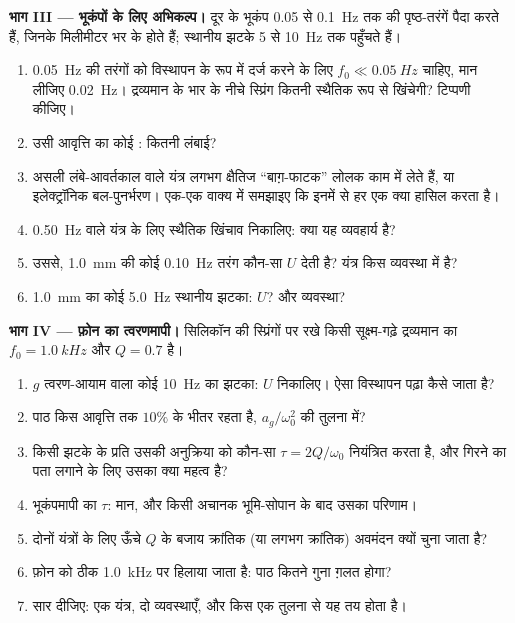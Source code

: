 \begin{problem}
\medskip
\noindent\textbf{भाग III --- भूकंपों के लिए अभिकल्प।}
दूर के भूकंप \qty{0.05}{} से \qty{0.1}{Hz} तक की पृष्ठ-तरंगें पैदा करते हैं,
जिनके  मिलीमीटर भर के होते हैं; स्थानीय झटके \qty{5}{} से \qty{10}{Hz}
तक पहुँचते हैं।
\begin{enumerate}[resume]
  \item \qty{0.05}{Hz} की तरंगों को विस्थापन के रूप में दर्ज करने के लिए
        $f_0 \ll \qty{0.05}{Hz}$ चाहिए, मान लीजिए \qty{0.02}{Hz}।
        द्रव्यमान के भार के नीचे स्प्रिंग कितनी स्थैतिक रूप से खिंचेगी?
        टिप्पणी कीजिए।
  \item उसी आवृत्ति का कोई : कितनी लंबाई?
  \item असली लंबे-आवर्तकाल वाले यंत्र लगभग क्षैतिज ``बाग़-फाटक'' लोलक काम
        में लेते हैं, या इलेक्ट्रॉनिक बल-पुनर्भरण। एक-एक वाक्य में समझाइए
        कि इनमें से हर एक क्या हासिल करता है।
  \item \qty{0.50}{Hz} वाले यंत्र के लिए स्थैतिक खिंचाव निकालिए: क्या यह
        व्यवहार्य है?
  \item उससे, \qty{1.0}{mm}  की कोई \qty{0.10}{Hz} तरंग कौन-सा $U$ देती
        है? यंत्र किस व्यवस्था में है?
  \item \qty{1.0}{mm}  का कोई \qty{5.0}{Hz} स्थानीय झटका: $U$? और
        व्यवस्था?
\end{enumerate}

\medskip
\noindent\textbf{भाग IV --- फ़ोन का त्वरणमापी।}
सिलिकॉन की स्प्रिंगों पर रखे किसी सूक्ष्म-गढ़े द्रव्यमान का
$f_0 = \qty{1.0}{kHz}$ और $Q = 0.7$ है।
\begin{enumerate}[resume]
  \item $g$ त्वरण-आयाम वाला कोई \qty{10}{Hz} का झटका: $U$ निकालिए। ऐसा
        विस्थापन पढ़ा कैसे जाता है?
  \item पाठ किस आवृत्ति तक $10\%$ के भीतर रहता है, $a_g/\omega_0^2$ की तुलना
        में?
  \item किसी झटके के प्रति उसकी अनुक्रिया को कौन-सा 
        $\tau = 2Q/\omega_0$ नियंत्रित करता है, और गिरने का पता लगाने के लिए
        उसका क्या महत्व है?
  \item भूकंपमापी का $\tau$: मान, और किसी अचानक भूमि-सोपान के बाद उसका
        परिणाम।
  \item दोनों यंत्रों के लिए ऊँचे $Q$ के बजाय क्रांतिक (या लगभग क्रांतिक)
        अवमंदन क्यों चुना जाता है?
  \item फ़ोन को ठीक \qty{1.0}{kHz} पर हिलाया जाता है: पाठ कितने गुना ग़लत
        होगा?
  \item सार दीजिए: एक यंत्र, दो व्यवस्थाएँ, और किस एक तुलना से यह तय होता
        है।
\end{enumerate}
\end{problem}
